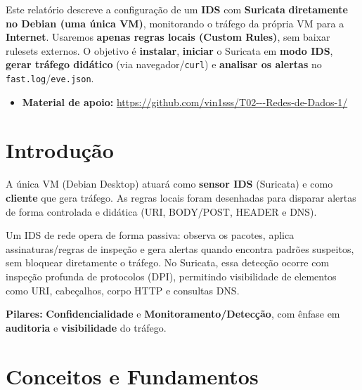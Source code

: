 ﻿




\noindent
Este relatório descreve a configuração de um \textbf{IDS} com \textbf{Suricata} \textbf{diretamente no Debian (uma única VM)}, monitorando o tráfego da própria VM para a \textbf{Internet}. Usaremos \textbf{apenas regras locais (Custom Rules)}, sem baixar rulesets externos. O objetivo é \textbf{instalar}, \textbf{iniciar} o Suricata em \textbf{modo IDS}, \textbf{gerar tráfego didático} (via navegador/\texttt{curl}) e \textbf{analisar os alertas} no \texttt{fast.log}/\texttt{eve.json}.

\begin{itemize}
  \item \textbf{Material de apoio:} \url{https://github.com/vin1sss/T02---Redes-de-Dados-1/}
\end{itemize}

\section{Introdução}

A única VM (Debian Desktop) atuará como \textbf{sensor IDS} (Suricata) e como \textbf{cliente} que gera tráfego. As regras locais foram desenhadas para disparar alertas de forma controlada e didática (URI, BODY/POST, HEADER e DNS).

Um IDS de rede opera de forma passiva: observa os pacotes, aplica assinaturas/regras de inspeção e gera alertas quando encontra padrões suspeitos, sem bloquear diretamente o tráfego. No Suricata, essa detecção ocorre com inspeção profunda de protocolos (DPI), permitindo visibilidade de elementos como URI, cabeçalhos, corpo HTTP e consultas DNS.

\textbf{Pilares:} \textbf{Confidencialidade} e \textbf{Monitoramento/Detecção}, com ênfase em \textbf{auditoria} e \textbf{visibilidade} do tráfego.

\section{Conceitos e Fundamentos}

